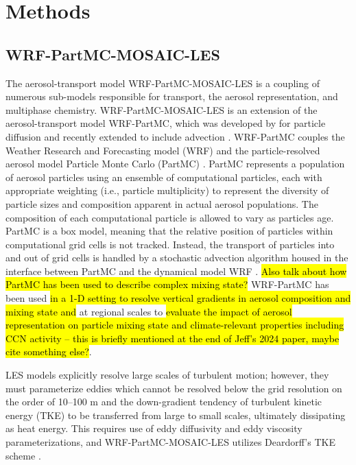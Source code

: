 \documentclass[journal abbreviation, manuscript]{copernicus}
\begin{document}
\section{Methods}

\subsection{WRF-PartMC-MOSAIC-LES}

The aerosol-transport model WRF-PartMC-MOSAIC-LES is a coupling of numerous sub-models responsible for transport, the aerosol representation, and multiphase chemistry. WRF-PartMC-MOSAIC-LES is an extension of the aerosol-transport model WRF-PartMC, which was developed by \citep{curtis_single-column_2017} for particle diffusion and recently extended to include advection \citep{gmd-17-8399-2024}. WRF-PartMC couples the Weather Research and Forecasting model (WRF) \citep{skamarock_description_2008} and the particle-resolved aerosol model Particle Monte Carlo (PartMC) \citep{riemer_simulating_2009}. PartMC represents a population of aerosol particles using an ensemble of computational particles, each with appropriate weighting (i.e., particle multiplicity) to represent the diversity of particle sizes and composition apparent in actual aerosol populations. The composition of each computational particle is allowed to vary as particles age. PartMC is a box model, meaning that the relative position of particles within computational grid cells is not tracked. Instead, the transport of particles into and out of grid cells is handled by a stochastic advection algorithm housed in the interface between PartMC and the dynamical model WRF \citep{gmd-17-8399-2024}. \hl{Also talk about how PartMC has been used to describe complex mixing state?} WRF-PartMC has been used \hl{in a 1-D setting to resolve vertical gradients in aerosol composition and mixing state and} at regional scales to \hl{evaluate the impact of aerosol representation on particle mixing state and climate-relevant properties including CCN activity -- this is briefly mentioned at the end of Jeff's 2024 paper, maybe cite something else?}. 

LES models explicitly resolve large scales of turbulent motion; however, they must parameterize eddies which cannot be resolved below the grid resolution on the order of 10--100 m and the down-gradient tendency of turbulent kinetic energy (TKE) to be transferred from large to small scales, ultimately dissipating as heat energy. This requires use of eddy diffusivity and eddy viscosity parameterizations, and WRF-PartMC-MOSAIC-LES utilizes Deardorff's TKE scheme \citep{deardorff_stratocumulus-capped_1980}.
\end{document}
